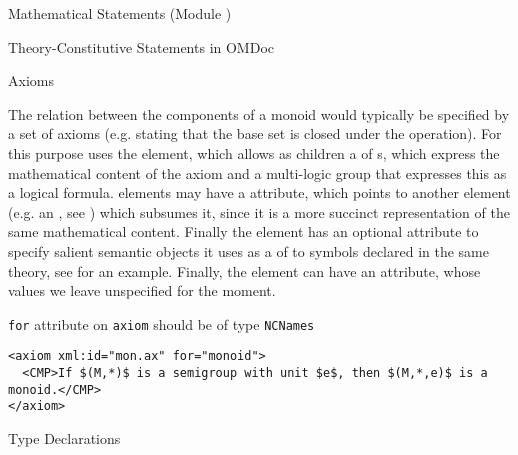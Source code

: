 \begin{tchapter}[id=statements,short=Mathematical Statements]{Mathematical Statements (Module {})}
\begin{tsection}[id=definitions]{Theory-Constitutive Statements in OMDoc}
\begin{tsubsection}[id=axioms]{Axioms}  
  
  The relation between the components of a monoid would typically be specified by a set of
  axioms (e.g. stating that the base set is closed under the operation). For this purpose
  {\omdoc} uses the {} element, which allows as children a
  {} of {}s, which express the mathematical
  content of the axiom and a multi-logic {} group
  that expresses this as a logical formula.  {} elements may have a
  {} attribute, which points to another {\omdoc} element
  (e.g. an {}, see {}) which subsumes it, since it is a more
  succinct representation of the same mathematical content. Finally the {}
  element has an optional {} attribute to specify salient semantic
  objects it uses as a {} of
   to symbols declared in the same theory, see {} for
  an example. Finally, the {} element can have an {}
  attribute, whose values we leave unspecified for the moment.

\begin{erratum}[reported-by=Michael Kohlhase,date=2009-08-11]{{\texttt{for}} attribute on
    {\texttt{axiom}} should be of type {\texttt{NCNames}}}
\begin{lstlisting}[label=lst:axiom,mathescape,
  caption={An {\omdoc} {\element{axiom}}},index={axiom}]
<axiom xml:id="mon.ax" for="monoid">
  <CMP>If $(M,*)$ is a semigroup with unit $e$, then $(M,*,e)$ is a monoid.</CMP>
</axiom>
\end{lstlisting}
\end{erratum}
\end{tsubsection}

\begin{tsubsection}[id=type-axioms]{Type Declarations}


\end{tsubsection}
\end{tsection}
\end{tchapter}
